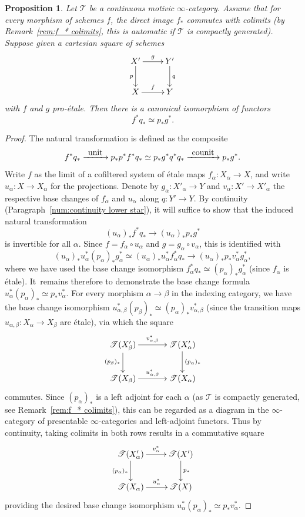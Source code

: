 \documentclass[11pt]{article}
\numberwithin{equation}{section}\renewcommand{\encodingdefault}{TU}
\def\To#1{\mathchoice{\xrightarrow{\textstyle\kern4pt#1\kern3pt}}{\stackrel{#1}{\longrightarrow}}{}{}}
\newcommand{\T}{\mathscr T}
\newtheorem{prop}[thm]{Proposition}
\theoremstyle{remark}
\theoremstyle{definition}
\numberwithin{equation}{thm}
\begin{document}
\begin{prop}\label{prop:pro-etale base change}
Let $\T$ be a continuous motivic $\infty$-category.
Assume that for every morphism of schemes $f$, the direct image $f_*$ commutes with colimits (by Remark~\ref{rem:f_* colimits}, this is automatic if $\T$ is compactly generated).
Suppose given a cartesian square of schemes
\[
\xymatrix{X' \ar[r]^-{g}\ar[d]_{p}
& Y' \ar[d]^{q}
\\
X \ar[r]^-{f}
& Y
}
\]
with $f$ and $g$ pro-étale.
Then there is a canonical isomorphism of functors
\[
f^*q_* \simeq p_*g^*.
\]
\end{prop}
\begin{proof}
The natural transformation is defined as the composite
\[
f^*q_*
\To{\mathrm{unit}} p_*p^*f^*q_*
\simeq p_*g^*q^*q_*
\To{\mathrm{counit}} p_*g^*.
\]
Write $f$ as the limit of a cofiltered system of étale maps $f_\alpha : X_\alpha \to X$, and write \hbox{$u_\alpha : X \to X_\alpha$} for the projections.
Denote by $g_\alpha : X'_\alpha\to Y$ and $v_\alpha : X' \to X'_\alpha$ the respective base changes of $f_\alpha$ and $u_\alpha$ along $q : Y' \to Y$.
By continuity (Paragraph~\ref{num:continuity lower star}), it will suffice to show that the induced natural transformation
\[
(u_\alpha)_*f^*q_* \to (u_\alpha)_*p_*g^*
\]
is invertible for all $\alpha$.
Since $f = f_\alpha\circ u_\alpha$ and $g = g_\alpha\circ v_\alpha$, this is identified with
\[
(u_\alpha)_*u_\alpha^*(p_\alpha)_*g_\alpha^*
\simeq (u_\alpha)_*u_\alpha^*f_\alpha^*q_*
\to (u_\alpha)_*p_*v_\alpha^*g_\alpha^*,
\]
where we have used the base change isomorphism $f_\alpha^*q_* \simeq (p_\alpha)_*g_\alpha^*$ (since $f_\alpha$ is étale).
It~remains therefore to demonstrate the base change formula $u_\alpha^*(p_\alpha)_* \simeq p_*v_\alpha^*$.
For every morphism $\alpha \to \beta$ in the indexing category, we have the base change isomorphism $u_{\alpha,\beta}^*(p_\beta)_* \simeq (p_\alpha)_*v_{\alpha,\beta}^*$ (since the transition maps $u_{\alpha,\beta} : X_\alpha \to X_\beta$ are étale), via which the square
\[
\xymatrix@C=1.2cm{
\T(X'_\beta) \ar[r]^-{v_{\alpha,\beta}^*}\ar[d]_{(p_\beta)_*}
& \T(X'_\alpha) \ar[d]^{(p_\alpha)_*}
\\
\T(X_\beta) \ar[r]^{u_{\alpha,\beta}^*}
& \T(X_\alpha)
}
\]
commutes.
Since $(p_\alpha)_*$ is a left adjoint for each $\alpha$ (as $\T$ is compactly generated, see Remark~\ref{rem:f_* colimits}), this can be regarded as a diagram in the $\infty$-category of presentable $\infty$-categories and left-adjoint functors.
Thus by continuity, taking colimits in both rows results in a commutative square
\[
\xymatrix{
\T(X'_\alpha) \ar[r]^-{v_{\alpha}^*}\ar[d]_{(p_\alpha)_*}
& \T(X') \ar[d]^{p_*}
\\
\T(X_\alpha) \ar[r]^-{u_{\alpha}^*}
& \T(X)
}
\]
providing the desired base change isomorphism $u_\alpha^*(p_\alpha)_* \simeq p_*v_\alpha^*$.
\end{proof}
\end{document}
